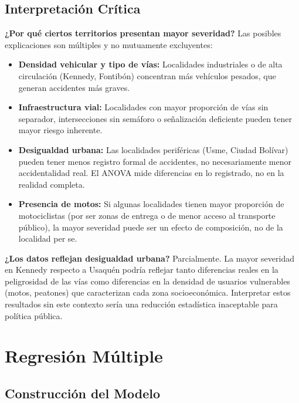 \documentclass[11pt,a4paper]{article}
\begin{document}
\subsection{Interpretación Crítica}

\textbf{¿Por qué ciertos territorios presentan mayor severidad?} Las posibles explicaciones
son múltiples y no mutuamente excluyentes:

\begin{itemize}
  \item \textbf{Densidad vehicular y tipo de vías:} Localidades industriales o de alta
        circulación (Kennedy, Fontibón) concentran más vehículos pesados, que generan
        accidentes más graves.
  \item \textbf{Infraestructura vial:} Localidades con mayor proporción de vías sin
        separador, intersecciones sin semáforo o señalización deficiente pueden tener mayor
        riesgo inherente.
  \item \textbf{Desigualdad urbana:} Las localidades periféricas (Usme, Ciudad Bolívar)
        pueden tener menos registro formal de accidentes, no necesariamente menor
        accidentalidad real. El ANOVA mide diferencias en lo registrado, no en la
        realidad completa.
  \item \textbf{Presencia de motos:} Si algunas localidades tienen mayor proporción de
        motociclistas (por ser zonas de entrega o de menor acceso al transporte público),
        la mayor severidad puede ser un efecto de composición, no de la localidad per se.
\end{itemize}

\textbf{¿Los datos reflejan desigualdad urbana?} Parcialmente. La mayor severidad en
Kennedy respecto a Usaquén podría reflejar tanto diferencias reales en la peligrosidad de
las vías como diferencias en la densidad de usuarios vulnerables (motos, peatones) que
caracterizan cada zona socioeconómica. Interpretar estos resultados sin este contexto
sería una reducción estadística inaceptable para política pública.

\section{Regresión Múltiple}

\subsection{Construcción del Modelo}
\end{document}
